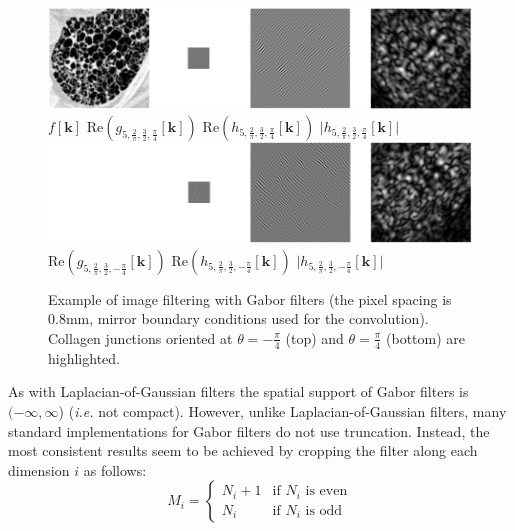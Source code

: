 \documentclass[fleqn,a4paper,oneside,openany]{book}
\renewcommand{\marginnote}[2][]{}
\begin{document}
\begin{figure}
\centering
\includegraphics[trim = 0 0 0 0, clip, width=\linewidth]{Gabor_example.png}\\
\hspace{.5cm}
$f[\boldsymbol{k}]$
\hspace{1.6cm}
$\text{Re}\left(g_{5,\frac{2}{\pi},\frac{3}{2},\frac{\pi}{4}}[\boldsymbol{k}]\right)$
\hspace{.8cm}
$\text{Re}\left(h_{5,\frac{2}{\pi},\frac{3}{2},\frac{\pi}{4}}[\boldsymbol{k}]\right)$
\hspace{1.6cm}
$\lvert h_{5,\frac{2}{\pi},\frac{3}{2},\frac{\pi}{4}}[\boldsymbol{k}]\rvert$\\
\vspace{.3cm}
\includegraphics[trim = 0 0 0 0, clip, width=\linewidth]{Gabor_example2.png}\\
\hspace{.5cm}
\phantom{$f[\boldsymbol{k}]$}
\hspace{1.6cm}
$\text{Re}\left(g_{5,\frac{2}{\pi},\frac{3}{2},-\frac{\pi}{4}}[\boldsymbol{k}]\right)$
\hspace{.7cm}
$\text{Re}\left(h_{5,\frac{2}{\pi},\frac{3}{2},-\frac{\pi}{4}}[\boldsymbol{k}]\right)$
\hspace{1.5cm}
$\lvert h_{5,\frac{2}{\pi},\frac{3}{2},-\frac{\pi}{4}}[\boldsymbol{k}]\rvert$
\caption{Example of image filtering with Gabor filters (the pixel spacing is 0.8mm, mirror boundary conditions used for the convolution).
Collagen junctions oriented at $\theta=-\frac{\pi}{4}$ (top) and $\theta=\frac{\pi}{4}$ (bottom) are highlighted.
}
  \label{fig:Gabor_example}
\end{figure}
%

\marginnote{\footnotesize v4: Clarified spatial extent of Gabor filter support; v6: Updated description to produce the most consistent results.}
As with Laplacian-of-Gaussian filters the spatial support of Gabor filters is \((-\infty, \infty\)) (\emph{i.e.} not compact). However, unlike Laplacian-of-Gaussian filters, many standard implementations for Gabor filters do not use truncation. Instead, the most consistent results seem to be achieved by cropping the filter along each dimension $i$ as follows:
\begin{equation}\label{eq:gaborFilterSupport}
M_i= 
\begin{cases}
N_i + 1 & \text{if } N_i \text{ is even}\\
N_i & \text{if } N_i \text{ is odd}
\end{cases}
\end{equation}
%
\end{document}
